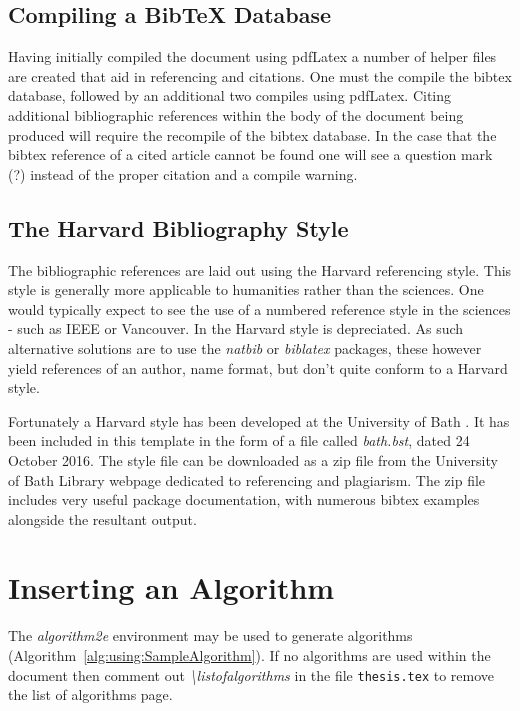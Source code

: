 \subsection{Compiling a BibTeX Database}

Having initially compiled the document using pdfLatex a number of helper files are created that aid in referencing and citations. One must the compile the bibtex database, followed by an additional two compiles using pdfLatex. Citing additional bibliographic references within the body of the document being produced will require the recompile of the bibtex database. In the case that the bibtex reference of a cited article cannot be found one will see a question mark (?) instead of the proper citation and a compile warning.

\subsection{The Harvard Bibliography Style}

The bibliographic references are laid out using the Harvard referencing style. This style is generally more applicable to humanities rather than the sciences. One would typically expect to see the use of a numbered reference style in the sciences - such as IEEE or Vancouver. In \latex the Harvard style is depreciated. As such alternative solutions are to use the \emph{natbib} or \emph{biblatex} packages, these however yield references of an author, name format, but don't quite conform to a Harvard style. 

Fortunately a Harvard style has been developed at the University of Bath \citep{online:Bath:2016:HarvardBathStyle}. It has been included in this template in the form of a file called \emph{bath.bst}, dated 24 October 2016. The style file can be downloaded as a zip file from the University of Bath Library webpage dedicated to referencing and plagiarism. The zip file includes very useful package documentation, with numerous bibtex examples alongside the resultant output.  

\section{Inserting an Algorithm}

The \emph{algorithm2e} environment \citep{online:Fiorio2016algorithm2e} may be used to generate algorithms (Algorithm~\ref{alg:using:SampleAlgorithm}). If no algorithms are used within the document then comment out \emph{\textbackslash listofalgorithms } in the file {\tt thesis.tex} to remove the list of algorithms page.

